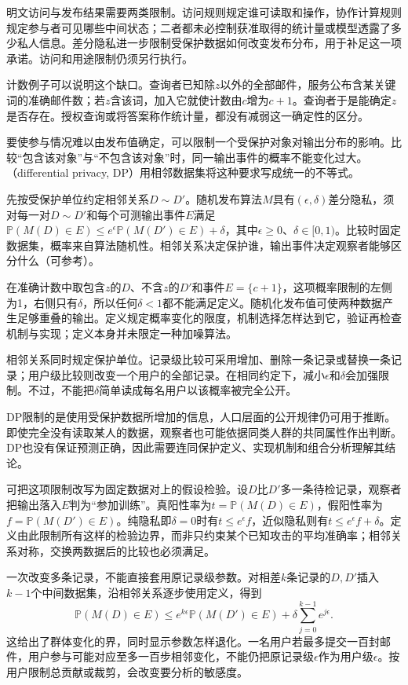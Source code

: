 明文访问与发布结果需要两类限制。访问规则规定谁可读取和操作，协作计算规则规定参与者可见哪些中间状态；二者都未必控制获准取得的统计量或模型透露了多少私人信息。差分隐私进一步限制受保护数据如何改变发布分布，用于补足这一项承诺。访问和用途限制仍须另行执行。

计数例子可以说明这个缺口。查询者已知除$z$以外的全部邮件，服务公布含某关键词的准确邮件数；若$z$含该词，加入它就使计数由$c$增为$c+1$。查询者于是能确定$z$是否存在。授权查询或将答案称作统计量，都没有减弱这一确定性的区分。

要使参与情况难以由发布值确定，可以限制一个受保护对象对输出分布的影响。比较“包含该对象”与“不包含该对象”时，同一输出事件的概率不能变化过大。（differential privacy, DP）用相邻数据集将这种要求写成统一的不等式。

先按受保护单位约定相邻关系$D\sim D'$。随机发布算法$M$具有$(\epsilon,\delta)$差分隐私，须对每一对$D\sim D'$和每个可测输出事件$E$满足$\mathbb P(M(D)\in E)\leq e^\epsilon\mathbb P(M(D')\in E)+\delta$，其中$\epsilon\geq0$、$\delta\in[0,1)$。比较时固定数据集，概率来自算法随机性。相邻关系决定保护谁，输出事件决定观察者能够区分什么（可参考）。

在准确计数中取包含$z$的$D$、不含$z$的$D'$和事件$E=\{c+1\}$，这项概率限制的左侧为1，右侧只有$\delta$，所以任何$\delta<1$都不能满足定义。随机化发布值可使两种数据产生足够重叠的输出。定义规定概率变化的限度，机制选择怎样达到它，验证再检查机制与实现；定义本身并未限定一种加噪算法。

相邻关系同时规定保护单位。记录级比较可采用增加、删除一条记录或替换一条记录；用户级比较则改变一个用户的全部记录。在相同约定下，减小$\epsilon$和$\delta$会加强限制。不过，不能把$\delta$简单读成每名用户以该概率被完全公开。

DP限制的是使用受保护数据所增加的信息，人口层面的公开规律仍可用于推断。即使完全没有读取某人的数据，观察者也可能依据同类人群的共同属性作出判断。DP也没有保证预测正确，因此需要连同保护定义、实现机制和组合分析理解其结论。

可把这项限制改写为固定数据对上的假设检验。设$D$比$D'$多一条待检记录，观察者把输出落入$E$判为“参加训练”。真阳性率为$t=\mathbb P(M(D)\in E)$，假阳性率为$f=\mathbb P(M(D')\in E)$。纯隐私即$\delta=0$时有$t\leq e^\epsilon f$，近似隐私则有$t\leq e^\epsilon f+\delta$。定义由此限制所有这样的检验边界，而非只约束某个已知攻击的平均准确率；相邻关系对称，交换两数据后的比较也必须满足。

一次改变多条记录，不能直接套用原记录级参数。对相差$k$条记录的$D,D'$插入$k-1$个中间数据集，沿相邻关系逐步使用定义，得到
\begin{equation}
 \mathbb P(M(D)\in E)
 \leq e^{k\epsilon}\mathbb P(M(D')\in E)
   +\delta\sum_{j=0}^{k-1}e^{j\epsilon}.
 \label{eq:privacy-group-bound}
\end{equation}
这给出了群体变化的界，同时显示参数怎样退化。一名用户若最多提交一百封邮件，用户参与可能对应至多一百步相邻变化，不能仍把原记录级$\epsilon$作为用户级$\epsilon$。按用户限制总贡献或裁剪，会改变要分析的敏感度。

